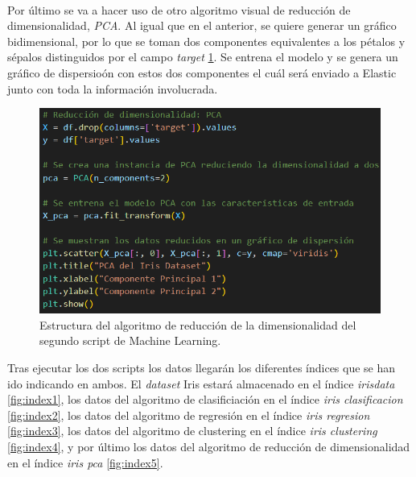 \paragraph{}

Por último se va a hacer uso de otro algoritmo visual de reducción de dimensionalidad, \textit{PCA}. Al igual que en el anterior, se quiere generar un gráfico bidimensional, por lo que se toman dos componentes equivalentes a los pétalos y sépalos distinguidos por el campo \textit{target} \ref{fig:pca1}. Se entrena el modelo y se genera un gráfico de dispersioón con estos dos componentes el cuál será enviado a Elastic junto con toda la información involucrada. 
\begin{figure}
    \centering
    \includegraphics[width=1\linewidth]{img/iris11.png}
    \caption{Estructura del algoritmo de reducción de la dimensionalidad del segundo script de Machine Learning.}
    \label{fig:pca1}
\end{figure}

Tras ejecutar los dos scripts los datos llegarán los diferentes índices que se han ido indicando en ambos. El \textit{dataset} Iris estará almacenado en el índice \textit{irisdata} \ref{fig:index1}, los datos del algoritmo de clasificiación en el índice \textit{iris clasificacion} \ref{fig:index2}, los datos del algoritmo de regresión en el índice \textit{iris regresion} \ref{fig:index3}, los datos del algoritmo de clustering en el índice \textit{iris clustering} \ref{fig:index4},  y por último los datos del algoritmo de reducción de dimensionalidad en el índice \textit{iris pca} \ref{fig:index5}.

